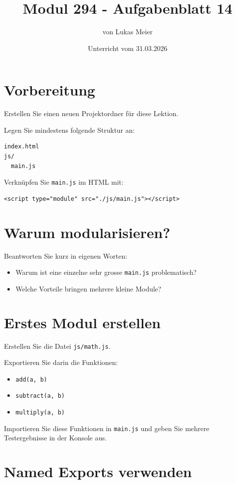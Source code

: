 \documentclass[a4paper,12pt]{article}
\title{Modul 294 - Aufgabenblatt 14}
\author{von Lukas Meier}
\date{Unterricht vom 31.03.2026}
\begin{document}
\maketitle

\section{Vorbereitung}

Erstellen Sie einen neuen Projektordner für diese Lektion.

Legen Sie mindestens folgende Struktur an:
\begin{verbatim}
index.html
js/
  main.js
\end{verbatim}

Verknüpfen Sie \texttt{main.js} im HTML mit:

\begin{verbatim}
<script type="module" src="./js/main.js"></script>
\end{verbatim}

\section{Warum modularisieren?}

Beantworten Sie kurz in eigenen Worten:
\begin{itemize}
    \item Warum ist eine einzelne sehr grosse \texttt{main.js} problematisch?
    \item Welche Vorteile bringen mehrere kleine Module?
\end{itemize}

\section{Erstes Modul erstellen}

Erstellen Sie die Datei \texttt{js/math.js}.

Exportieren Sie darin die Funktionen:
\begin{itemize}
    \item \texttt{add(a, b)}
    \item \texttt{subtract(a, b)}
    \item \texttt{multiply(a, b)}
\end{itemize}

Importieren Sie diese Funktionen in \texttt{main.js} und geben Sie mehrere Testergebnisse in der Konsole aus.

\section{Named Exports verwenden}
\end{document}
